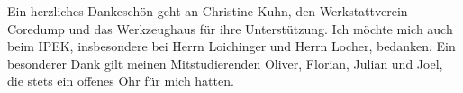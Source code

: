 Ein herzliches Dankeschön geht an Christine Kuhn, den Werkstattverein Coredump und das Werkzeughaus für ihre Unterstützung. Ich möchte mich auch beim IPEK, insbesondere bei Herrn Loichinger und Herrn Locher, bedanken. Ein besonderer Dank gilt meinen Mitstudierenden Oliver, Florian, Julian und Joel, die stets ein offenes Ohr für mich hatten.
